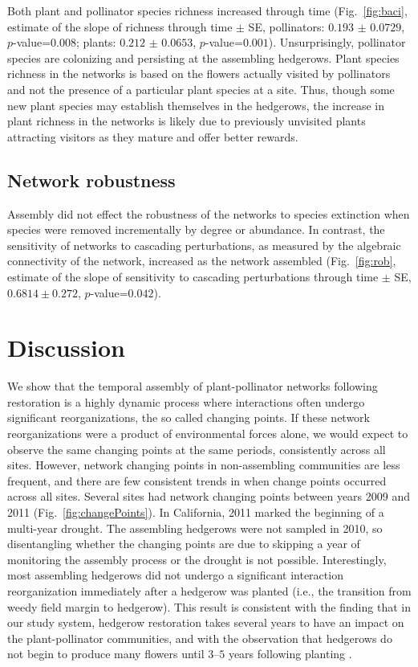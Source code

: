 \documentclass[12pt]{article}
\begin{document}
Both plant and pollinator species richness increased through time
(Fig.~\ref{fig:baci}, estimate of the slope of richness through time
$\pm$ SE, pollinators: $0.193$ $\pm$ $0.0729$, $p$-value=$0.008$;
plants: $0.212$ $\pm$ $0.0653$, $p$-value=$0.001$). Unsurprisingly,
pollinator species are colonizing and persisting at the assembling
hedgerows. Plant species richness in the networks is based on the
flowers actually visited by pollinators and not the presence of a
particular plant species at a site. Thus, though some new plant
species may establish themselves in the hedgerows, the increase in
plant richness in the networks is likely due to previously unvisited
plants attracting visitors as they mature and offer better rewards.

\subsection*{Network robustness}
Assembly did not effect the robustness of the networks to species
extinction when species were removed incrementally by
degree %
or abundance. %
In contrast, the sensitivity of networks to
cascading perturbations, as measured by the algebraic connectivity of
the network, increased as the network assembled (Fig.~\ref{fig:rob},
estimate of the slope of sensitivity to cascading perturbations
through time $\pm$ SE, $0.6814 \pm 0.272$, $p$-value=$0.042$).

\section*{Discussion}
\label{sec:discussion}

We show that the temporal assembly of plant-pollinator networks
following restoration is a highly dynamic process where interactions
often undergo significant reorganizations, the so called changing
points. If these network reorganizations were a product of
environmental forces alone, we would expect to observe the same
changing points at the same periods, consistently across all
sites. However, network changing points in non-assembling communities
are less frequent, and there are few consistent trends in when change
points occurred across all sites. Several sites had network changing
points between years 2009 and 2011 (Fig.~\ref{fig:changePoints}). In
California, 2011 marked the beginning of a multi-year drought. The
assembling hedgerows were not sampled in 2010, so disentangling
whether the changing points are due to skipping a year of monitoring
the assembly process or the drought is not possible. Interestingly,
most assembling hedgerows did not undergo a significant interaction
reorganization immediately after a hedgerow was planted (i.e., the
transition from weedy field margin to hedgerow). This result is
consistent with the finding that in our study system, hedgerow
restoration takes several years to have an impact on the
plant-pollinator communities, and with the observation that hedgerows
do not begin to produce many flowers until $3$--$5$ years following
planting \citep{kremen-2015-602}.
\end{document}
